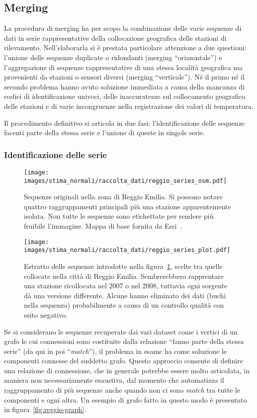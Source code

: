 \subsection{Merging}\label{ch:merging}
La procedura di merging ha per scopo la combinazione delle varie sequenze di dati in serie rappresentative della collocazione geografica delle stazioni di rilevamento. Nell'elaborarla si è prestata particolare attenzione a due questioni: l'unione delle sequenze duplicate o ridondanti (merging ``orizzontale'') e l'aggregazione di sequenze rappresentative di una stessa località geografica ma provenienti da stazioni o sensori diversi (merging ``verticale''). Né il primo né il secondo problema hanno avuto soluzione immediata a causa della mancanza di codici di identificazione univoci, delle inaccuratezze sul collocamento geografico delle stazioni e di varie incongruenze nella registrazione dei valori di temperatura.

Il procedimento definitivo si articola in due fasi: l'identificazione delle sequenze facenti parte della stessa serie e l'unione di queste in singole serie.

\subsubsection{Identificazione delle serie}
\begin{figure}[ht]
  \texttt{[image: images/stima\_normali/raccolta\_dati/reggio\_series\_osm.pdf]}
  \caption{Sequenze originali nella zona di Reggio Emilia. Si possono notare quattro raggruppamenti principali più una stazione apparentemente isolata. Non tutte le sequenze sono etichettate per rendere più fruibile l'immagine. Mappa di base fornita da Esri~\autocite{esriWorldTopographicMap2013}.}\label{fig:reggio-osm}
\end{figure}
\begin{figure}[ht]
  \texttt{[image: images/stima\_normali/raccolta\_dati/reggio\_series\_plot.pdf]}
  \caption{Estratto delle sequenze introdotte nella figura~\ref{fig:reggio-osm}, scelte tra quelle collocate nella città di Reggio Emilia. Sembrerebbero rapprentare una stazione ricollocata nel 2007 o nel 2008, tuttavia ogni sorgente dà una versione differente. Alcune hanno eliminato dei dati (buchi nella sequenza) probabilmente a causa di un controllo qualità con esito negativo.}\label{fig:reggio-plot}
\end{figure}
Se si considerano le sequenze recuperate dai vari dataset come i vertici di un grafo le cui connessioni sono costituite dalla relazione ``fanno parte della stessa serie'' (da qui in poi ``\emph{match}''), il problema in esame ha come soluzione le componenti connesse del suddetto grafo. Questo approccio consente di definire una relazione di connessione, che in generale potrebbe essere molto articolata, in maniera non necessariamente esaustiva, dal momento che automatizza il raggruppamento di più sequenze anche quando non ci sono \emph{match} tra tutte le componenti e ogni altra. Un esempio di grafo fatto in questo modo è presentato in figura~\ref{fig:reggio-graph}.

